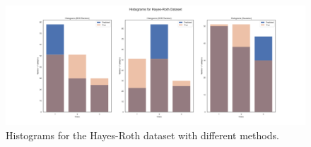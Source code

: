 \begin{figure}[H]
    \centering
    \includegraphics[width=\linewidth]{Attachments/histograms_hayes-roth.png}
    \caption{Histograms for the Hayes-Roth dataset with different methods.}
    \label{fig:hist_hr}
\end{figure}
